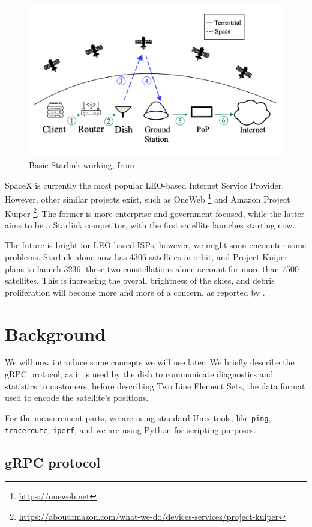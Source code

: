 \documentclass[IN,11pt,twoside,openright,idp,english]{tumthesis}
\begin{document}
\begin{figure}
    \centering
    \includegraphics[width=0.6\columnwidth]{img/starlink-101.png}
    \caption{Basic Starlink working, from \cite{izhikevich2023democratizing}}
    \label{fig:starlink-101}
\end{figure}      
    
SpaceX is currently the most popular LEO-based Internet Service Provider. However, other similar projects exist, such as OneWeb \footnote{\url{https://oneweb.net}} and Amazon Project Kuiper \footnote{\url{https://aboutamazon.com/what-we-do/devices-services/project-kuiper}}. The former is more enterprise and government-focused, while the latter aims to be a Starlink competitor, with the first satellite launches starting now.

The future is bright for LEO-based ISPs; however, we might soon encounter some problems. Starlink alone now has 4306 satellites in orbit, and Project Kuiper plans to launch 3236; these two constellations alone account for more than 7500 satellites. This is increasing the overall brightness of the skies, and debris proliferation will become more and more of a concern, as reported by \cite{cite-key}.
    
\section{Background}

We will now introduce some concepts we will use later. We briefly describe the gRPC protocol, as it is used by the dish to communicate diagnostics and statistics to customers, before describing Two Line Element Sets, the data format used to encode the satellite's positions. 

For the measurement parts, we are using standard Unix tools, like \texttt{ping}, \texttt{traceroute}, \texttt{iperf}, and we are using Python for scripting purposes.
\subsection{gRPC protocol}
    
\end{document}
